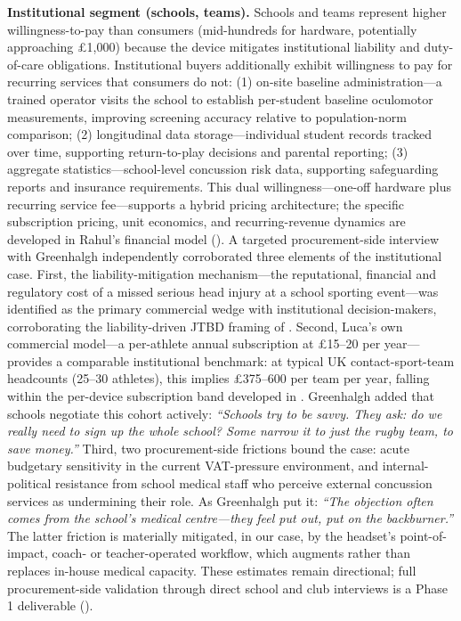 \textbf{Institutional segment (schools, teams).} Schools and teams represent higher willingness-to-pay than consumers (mid-hundreds for hardware, potentially approaching \pounds 1{,}000) because the device mitigates institutional liability and duty-of-care obligations. Institutional buyers additionally exhibit willingness to pay for recurring services that consumers do not: (1) on-site baseline administration---a trained operator visits the school to establish per-student baseline oculomotor measurements, improving screening accuracy relative to population-norm comparison; (2) longitudinal data storage---individual student records tracked over time, supporting return-to-play decisions and parental reporting; (3) aggregate statistics---school-level concussion risk data, supporting safeguarding reports and insurance requirements. This dual willingness---one-off hardware plus recurring service fee---supports a hybrid pricing architecture; the specific subscription pricing, unit economics, and recurring-revenue dynamics are developed in Rahul's financial model (). A targeted procurement-side interview with Greenhalgh independently corroborated three elements of the institutional case. First, the liability-mitigation mechanism---the reputational, financial and regulatory cost of a missed serious head injury at a school sporting event---was identified as the primary commercial wedge with institutional decision-makers, corroborating the liability-driven JTBD framing of . Second, Luca's own commercial model---a per-athlete annual subscription at \pounds 15--20 per year---provides a comparable institutional benchmark: at typical UK contact-sport-team headcounts (25--30 athletes), this implies \pounds 375--600 per team per year, falling within the per-device subscription band developed in . Greenhalgh added that schools negotiate this cohort actively: \textit{``Schools try to be savvy. They ask: do we really need to sign up the whole school? Some narrow it to just the rugby team, to save money.''} Third, two procurement-side frictions bound the case: acute budgetary sensitivity in the current VAT-pressure environment, and internal-political resistance from school medical staff who perceive external concussion services as undermining their role. As Greenhalgh put it: \textit{``The objection often comes from the school's medical centre---they feel put out, put on the backburner.''} The latter friction is materially mitigated, in our case, by the headset's point-of-impact, coach- or teacher-operated workflow, which augments rather than replaces in-house medical capacity. These estimates remain directional; full procurement-side validation through direct school and club interviews is a Phase 1 deliverable ().

